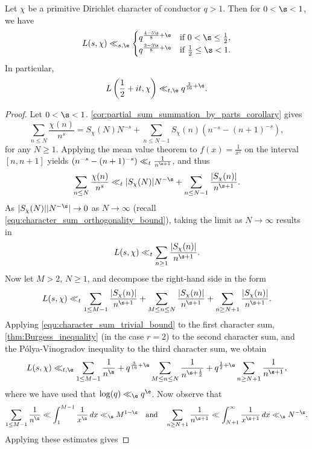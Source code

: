     \begin{theorem}\label{thm:Burgess_bound_conductor_aspect_Dirichlet}
      Let \(\chi\) be a primitive Dirichlet character of conductor \(q > 1\). Then for \(0 < \s < 1\), we have
      \[
        L(s,\chi) \ll_{s,\e} \begin{cases} q^{\frac{4-5\s}{8}+\e} & \text{if \(0 < \s \le \frac{1}{2}\)}, \\ q^{\frac{3-3\s}{8}+\e} & \text{if \(\frac{1}{2} \le \s < 1\)}. \end{cases}
      \]
      In particular,
      \[
        L\left(\frac{1}{2}+it,\chi\right) \ll_{t,\e} q^{\frac{3}{16}+\e}. 
      \]
    \end{theorem}
    \begin{proof}
      Let \(0 < \s < 1\). \cref{cor:partial_sum_summation_by_parts_corollary} gives
      \[
        \sum_{n \le N}\frac{\chi(n)}{n^{s}} = S_{\chi}(N)N^{-s}+\sum_{n \le N-1}S_{\chi}(n)(n^{-s}-(n+1)^{-s}),
      \]
      for any \(N \ge 1\). Applying the mean value theorem to \(f(x) = \frac{1}{x^{s}}\) on the interval \([n,n+1]\) yields \((n^{-s}-(n+1)^{-s}) \ll_{t} \frac{1}{n^{\s+1}}\), and thus
      \[
        \sum_{n \le N}\frac{\chi(n)}{n^{s}} \ll_{t} |S_{\chi}(N)|N^{-\s}+\sum_{n \le N-1}\frac{|S_{\chi}(n)|}{n^{\s+1}}.
      \]
      As \(|S_{\chi}(N)||N^{-\s}| \to 0\) as \(N \to \infty\) (recall \cref{equ:character_sum_orthogonality_bound}), taking the limit as \(N \to \infty\) results in
      \[
        L(s,\chi) \ll_{t} \sum_{n \ge 1}\frac{|S_{\chi}(n)|}{n^{\s+1}}.
      \]
      Now let \(M > 2\), \(N \ge 1\), and decompose the right-hand side in the form
      \[
        L(s,\chi) \ll_{t} \sum_{1 \le M-1}\frac{|S_{\chi}(n)|}{n^{\s+1}}+\sum_{M \le n \le N}\frac{|S_{\chi}(n)|}{n^{\s+1}}+\sum_{n \ge N+1}\frac{|S_{\chi}(n)|}{n^{\s+1}}.
      \]
      Applying \cref{equ:character_sum_trivial_bound} to the first character sum, \cref{thm:Burgess_inequality} (in the case \(r = 2\)) to the second character sum, and the P\'olya-Vinogradov inequality to the third character sum, we obtain
      \[
        L(s,\chi) \ll_{t,\e} \sum_{1 \le M-1}\frac{1}{n^{\s}}+q^{\frac{3}{16}+\e}\sum_{M \le n \le N}\frac{1}{n^{\s+\frac{1}{2}}}+q^{\frac{1}{2}+\e}\sum_{n \ge N+1}\frac{1}{n^{\s+1}},
      \]
      where we have used that \(\log(q) \ll_{\e} q^{\e}\). Now observe that
      \[
        \sum_{1 \le M-1}\frac{1}{n^{\s}} \ll \int_{1}^{M-1}\frac{1}{x^{\s}}\,dx \ll_{\s} M^{1-\s} \quad \text{and} \quad \sum_{n \ge N+1}\frac{1}{n^{\s+1}} \ll \int_{N+1}^{\infty}\frac{1}{x^{\s+1}}\,dx \ll_{\s} N^{-\s}.
      \]
      Applying these estimates gives

\end{proof}
